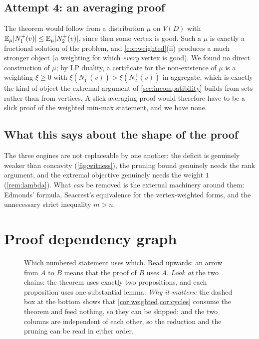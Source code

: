 \subsection*{Attempt 4: an averaging proof}

The theorem would follow from a distribution $\mu$ on $V(D)$ with
$\mathbb E_\mu\lvert N_1^+(v)\rvert\le\mathbb E_\mu\lvert N_2^+(v)\rvert$, since then some vertex is good. Such a
$\mu$ is exactly a fractional solution of the problem, and \cref{cor:weighted}(ii) produces a much
stronger object (a weighting for which \emph{every} vertex is good). We found no direct construction
of $\mu$; by LP duality, a certificate for the non-existence of $\mu$ is a weighting $\xi\ge0$ with
$\xi(N_1^+(v))>\xi(N_2^+(v))$ in aggregate, which is exactly the kind of object the extremal argument
of \cref{sec:incompatibility} builds from sets rather than from vertices. A slick averaging proof
would therefore have to be a slick proof of the weighted min-max statement, and we have none.

\subsection*{What this says about the shape of the proof}

The three engines are not replaceable by one another: the deficit is genuinely weaker than
concavity (\cref{fig:witness}), the pruning bound genuinely needs the rank argument, and the extremal
objective genuinely needs the weight $1$ (\cref{rem:lambda}). What \emph{can} be removed is the
external machinery around them: Edmonds' formula, Seacrest's equivalence for the vertex-weighted
forms, and the unnecessary strict inequality $m>n$.

\section{Proof dependency graph}\label{app:depgraph}

\begin{figure}[ht]
\centering

\caption{Which numbered statement uses which. Read upwards: an arrow from $A$ to $B$ means that the
 proof of $B$ uses $A$. \emph{Look at} the two chains: the theorem uses exactly two propositions, and
 each proposition uses one substantial lemma. \emph{Why it matters:} the dashed box at the bottom shows
 that \cref{cor:weighted,cor:cycles} consume the theorem and feed nothing, so they can be skipped; and
 the two columns are independent of each other, so the reduction and the pruning can be read in
 either order.}
\label{fig:depgraph}
\end{figure}

